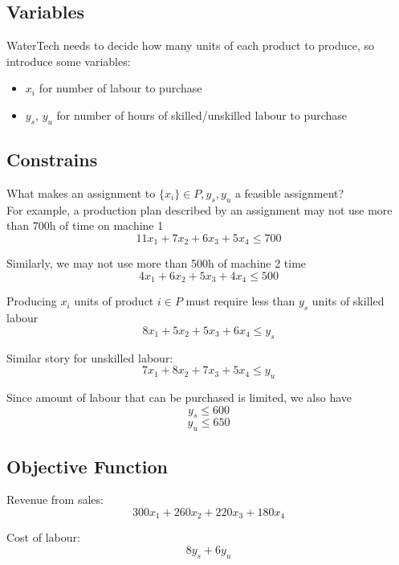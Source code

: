 \documentclass[letterpaper, 12pt]{article}
\begin{document}
    \subsection{Variables}

    WaterTech needs to decide how many units of each product to produce, so introduce some variables:
    \begin{itemize}
        \item $x_i$ for number of labour to purchase
        \item $y_s$, $y_u$ for number of hours of skilled/unskilled labour to purchase
    \end{itemize}

    \subsection{Constrains}
    What makes an assignment to $\{x_i\} \in P, y_s, y_u$ a feasible assignment?\\
    \bigskip
    For example, a production plan described by an assignment may not use more than 700h of time on machine 1
    $$11x_1 + 7x_2 + 6x_3 + 5x_4 \leq 700$$

    Similarly, we may not use more than 500h of machine 2 time
    $$4x_1 + 6x_2 + 5x_3 + 4x_4 \leq 500$$

    Producing $x_i$ units of product $i \in P$ must require less than $y_s$ units of skilled labour
    $$8x_1 + 5x_2 + 5x_3 + 6x_4 \leq y_s$$

    Similar story for unskilled labour:
    $$7x_1 + 8x_2 + 7x_3 + 5x_4 \leq y_u$$

    Since amount of labour that can be purchased is limited, we also have
    $$y_s \leq 600$$
    $$y_u \leq 650$$

    \subsection{Objective Function}
    Revenue from sales:\\
    $$300x_1 + 260x_2 + 220x_3 + 180x_4$$

    Cost of labour:\\
    $$8y_s + 6y_u$$
\end{document}
